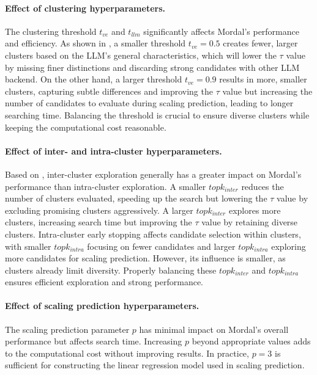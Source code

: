 \paragraph{Effect of clustering hyperparameters.} The clustering threshold $t_{ve}$ and $t_{llm}$ significantly affects Mordal's performance and efficiency. As shown in , a smaller threshold $t_{ve}=0.5$ creates fewer, larger clusters based on the LLM's general characteristics, which will lower the $\tau$ value by missing finer distinctions and discarding strong candidates with other LLM backend. On the other hand, a larger threshold $t_{ve}=0.9$ results in more, smaller clusters, capturing subtle differences and improving the $\tau$ value but increasing the number of candidates to evaluate during scaling prediction, leading to longer searching time. Balancing the threshold is crucial to ensure diverse clusters while keeping the computational cost reasonable.

\paragraph{Effect of inter- and intra-cluster hyperparameters.} Based on , inter-cluster exploration generally has a greater impact on Mordal's performance than intra-cluster exploration. A smaller $topk_{inter}$ reduces the number of clusters evaluated, speeding up the search but lowering the $\tau$ value by excluding promising clusters aggressively. A larger $topk_{inter}$ explores more clusters, increasing search time but improving the $\tau$ value by retaining diverse clusters. Intra-cluster early stopping affects candidate selection within clusters, with smaller $topk_{intra}$ focusing on fewer candidates and larger $topk_{intra}$ exploring more candidates for scaling prediction. However, its influence is smaller, as clusters already limit diversity. Properly balancing these $topk_{inter}$ and $topk_{intra}$ ensures efficient exploration and strong performance.

\paragraph{Effect of scaling prediction hyperparameters.} The scaling prediction parameter $p$ has minimal impact on Mordal's overall performance but affects search time. Increasing $p$ beyond appropriate values adds to the computational cost without improving results. In practice, $p=3$ is sufficient for constructing the linear regression model used in scaling prediction.



